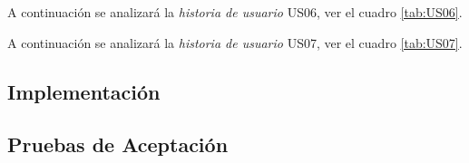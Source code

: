   A continuación se analizará la \emph{historia de usuario} US06, ver el cuadro \ref{tab:US06}.

    

    

  A continuación se analizará la \emph{historia de usuario} US07, ver el cuadro \ref{tab:US07}.

    

    



% 
%
%




  

  \subsection{Implementación}

   

  \subsection{Pruebas de Aceptación}

      

      


